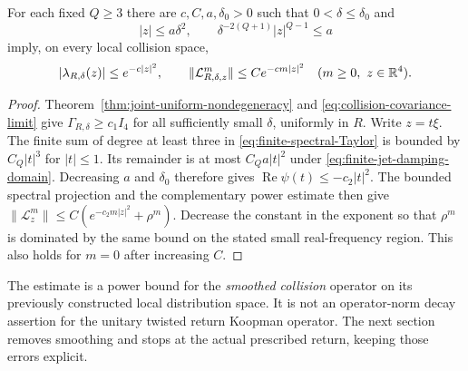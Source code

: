 \begin{corollary}
\label{cor:finite-jet-damping}
For each fixed $Q\ge3$ there are $c,C,a,\delta_0>0$ such that
$0<\delta\le\delta_0$ and
\begin{equation}\label{eq:finite-jet-damping-domain}
 |z|\le a\delta^2,\qquad
 \delta^{-2(Q+1)}|z|^{Q-1}\le a
\end{equation}
imply, on every local collision space,
\begin{equation}\label{eq:finite-jet-damping}
 |\lambda_{R,\delta}(z)|\le e^{-c|z|^2},\qquad
 \|\mathcal L_{R,\delta,z}^{m}\|\le Ce^{-cm|z|^2}
                \quad(m\ge0,\ z\in\R^4).
\end{equation}
\end{corollary}
\begin{proof}
Theorem~\ref{thm:joint-uniform-nondegeneracy} and
\eqref{eq:collision-covariance-limit} give
$\Gamma_{R,\delta}\ge c_1I_4$ for all sufficiently small $\delta$,
uniformly in $R$. Write $z=t\xi$. The finite sum of degree at least
three in \eqref{eq:finite-spectral-Taylor} is bounded by $C_Q|t|^3$
for $|t|\le1$. Its remainder is at most $C_Qa|t|^2$ under
\eqref{eq:finite-jet-damping-domain}. Decreasing $a$ and $\delta_0$
therefore gives $\operatorname{Re}\psi(t)\le-c_2|t|^2$.
The bounded spectral projection and the complementary power estimate
then give
$\|\mathcal L_z^m\|\le C(e^{-c_2m|z|^2}+\rho^m)$.
Decrease the constant in the exponent so that $\rho^m$ is dominated
by the same bound on the stated small real-frequency region. This
also holds for $m=0$ after increasing $C$.
\end{proof}

The estimate is a power bound for the \emph{smoothed collision}
operator on its previously constructed local distribution space.
It is not an operator-norm decay assertion for the unitary twisted
return Koopman operator. The next section removes smoothing and
stops at the actual prescribed return, keeping those errors explicit.
